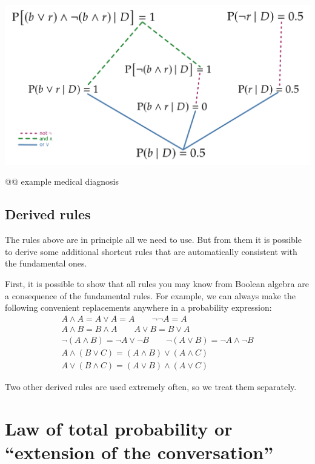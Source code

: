 \documentclass[
  a4paper,
  DIV=11,
  numbers=noendperiod,
  oneside]{scrreprt}
\begin{document}
\includegraphics{index_files/mediabag/umbrella_inference2.pdf}

@@ example medical diagnosis

\hypertarget{derived-rules}{%
\subsection{Derived rules}\label{derived-rules}}

The rules above are in principle all we need to use. But from them it is
possible to derive some additional shortcut rules that are automatically
consistent with the fundamental ones.

First, it is possible to show that all rules you may know from Boolean
algebra are a consequence of the fundamental rules. For example, we can
always make the following convenient replacements anywhere in a
probability expression: \[
\begin{gathered}
A \land A = A \lor A = A
\qquad
\lnot\lnot A = A
\\[1ex]
A\land B = B \land A
\qquad
A \lor B = B \lor A
\\[1ex]
\lnot (A \land B) = \lnot A \lor \lnot B
\qquad
\lnot (A \lor B) = \lnot A \land \lnot B
\\[1ex]
A \land (B \lor C) = (A \land B) \lor (A \land C)
\\[1ex]
A \lor (B \land C) = (A \lor B) \land (A \lor C)
\end{gathered}
\]

Two other derived rules are used extremely often, so we treat them
separately.

\hypertarget{law-of-total-probability-or-extension-of-the-conversation}{%
\section{Law of total probability or ``extension of the
conversation''}\label{law-of-total-probability-or-extension-of-the-conversation}}
\end{document}
